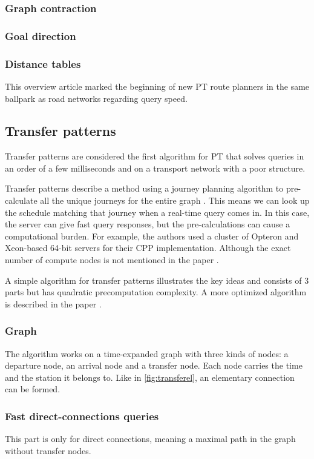\subsubsection{Graph contraction}
\subsubsection{Goal direction}
\subsubsection{Distance tables}


This overview article marked the beginning of new PT route planners in the same ballpark as road networks regarding query speed. 
\subsection{Transfer patterns}
Transfer patterns are considered the first algorithm for PT that solves queries in an order of a few milliseconds and on a transport network with a poor structure. 

Transfer patterns describe a method using a journey planning algorithm to pre-calculate all the unique journeys for the entire graph \cite{bast_fast_2010} %
. This means we can look up the schedule matching that journey when a real-time query comes in. In this case, the server can give fast query responses, but the pre-calculations can cause a computational burden. For example, the authors used a cluster of Opteron and Xeon-based 64-bit servers for their CPP implementation. Although the exact number of compute nodes is not mentioned in the paper \cite{bast_fast_2010}. 


A simple algorithm for transfer patterns illustrates the key ideas and consists of 3 parts but has quadratic precomputation complexity. A more optimized algorithm is described in the paper \cite{bast_fast_2010}.
\subsubsection{Graph}
The algorithm works on a time-expanded graph with three kinds of nodes: a departure node, an arrival node and a transfer node. Each node carries the time and the station it belongs to. Like in \autoref{fig:transferel}, an elementary connection can be formed.

\subsubsection{Fast direct-connections queries}
This part is only for direct connections, meaning a maximal path in the graph without transfer nodes.

